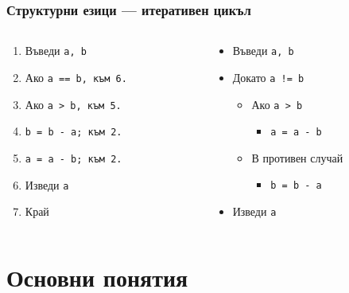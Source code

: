 \documentclass[alsotrans]{beamerswitch}
\begin{document}
\begin{frame}
  \frametitle{Структурни езици — итеративен цикъл}

  \begin{columns}[t,onlytextwidth]
    \begin{column}{.5\textwidth}
      \begin{enumerate}
      \item Въведи \tt a, \tt b
      \item Ако \tt{a == b}, към 6.
      \item Ако \tt{a > b}, към 5.
      \item \tt{b = b - a}; към 2.
      \item \tt{a = a - b}; към 2.
      \item Изведи \tt a
      \item Край
      \end{enumerate}
    \end{column}
    \begin{column}{.5\textwidth}
      \begin{itemize}
      \item Въведи \tt a, \tt b
      \item Докато \tt{a != b}
        \begin{itemize}
        \item Ако \tt{a > b}
          \begin{itemize}
          \item \tt{a = a - b}
          \end{itemize}
        \item В противен случай
          \begin{itemize}
          \item \tt{b = b - a}
          \end{itemize}
        \end{itemize}
      \item Изведи \tt a
      \end{itemize}
    \end{column}
  \end{columns}
\end{frame}

\section{Основни понятия}
\end{document}
